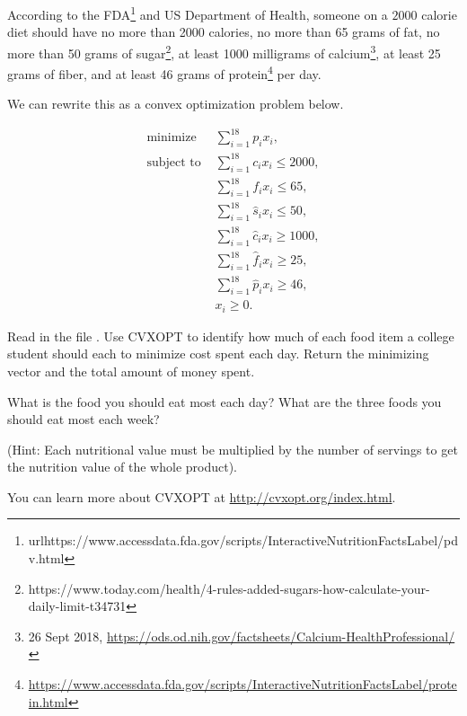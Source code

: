  According to the FDA\footnote[1]{url{https://www.accessdata.fda.gov/scripts/InteractiveNutritionFactsLabel/pdv.html}} and US Department of Health, someone on a $2000$ calorie diet should have no more than 2000 calories, no more than 65 grams of fat, no more than 50 grams of sugar\footnote[2]{https://www.today.com/health/4-rules-added-sugars-how-calculate-your-daily-limit-t34731}, at least 1000 milligrams of calcium\footnote[1]{26 Sept 2018, \url{https://ods.od.nih.gov/factsheets/Calcium-HealthProfessional/}}, at least 25 grams of fiber, and at least 46 grams of protein\footnote[2]{\url{https://www.accessdata.fda.gov/scripts/InteractiveNutritionFactsLabel/protein.html}} per day.

 We can rewrite this as a convex optimization problem below.

 \begin{align*}
\text{minimize } & \sum_{i=1}^{18}p_ix_i, \\
\text{subject to }& \sum_{i=1}^{18} c_ix_i \leq 2000, \\
			& \sum_{i=1}^{18} f_ix_i \leq 65, \\
			& \sum_{i=1}^{18} \hat{s}_ix_i \leq 50, \\
			& \sum_{i=1}^{18} \hat{c}_ix_i \geq 1000, \\
			& \sum_{i=1}^{18} \hat{f}_ix_i \geq 25, \\
			& \sum_{i=1}^{18} \hat{p}_ix_i \geq 46, \\
			& x_i \geq 0.
\end{align*}

 \begin{problem}
Read in the file .
Use CVXOPT to identify how much of each food item a college student should each to minimize cost spent each day.
Return the minimizing vector and the total amount of money spent.

What is the food you should eat most each day? 
What are the three foods you should eat most each week?

(Hint: Each nutritional value must be multiplied by the number of servings to get the nutrition value of the whole product).
\label{prob:diet}
\end{problem}

You can learn more about CVXOPT at
\url{http://cvxopt.org/index.html}.
